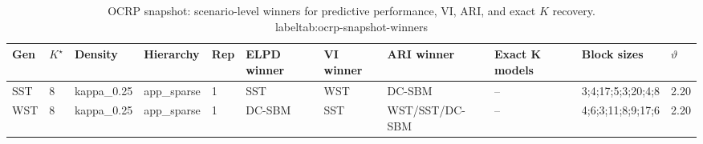 \begin{table}[!h]
\centering
\caption{OCRP snapshot: scenario-level winners for predictive performance, VI, ARI, and exact $K$ recovery.\\label{tab:ocrp-snapshot-winners}}
\centering
\begin{tabular}[t]{lllllllllll}
\toprule
Gen & $K^\star$ & Density & Hierarchy & Rep & ELPD winner & VI winner & ARI winner & Exact K models & Block sizes & $\vartheta$\\
\midrule
SST & 8 & kappa_0.25 & app_sparse & 1 & SST & WST & DC-SBM & -- & 3;4;17;5;3;20;4;8 & 2.20\\
WST & 8 & kappa_0.25 & app_sparse & 1 & DC-SBM & SST & WST/SST/DC-SBM & -- & 4;6;3;11;8;9;17;6 & 2.20\\
\bottomrule
\end{tabular}
\end{table}

